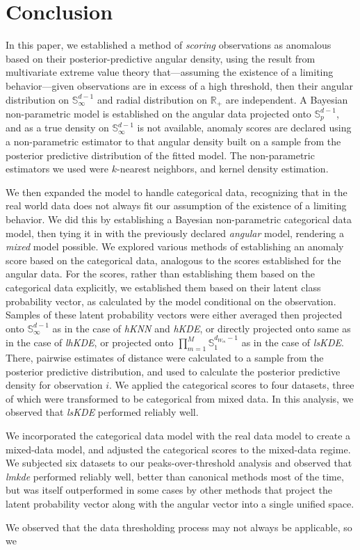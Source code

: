 \section{Conclusion\label{sec:conclusion}}
In this paper, we established a method of \emph{scoring} observations as anomalous based
    on their posterior-predictive angular density, using the result from multivariate 
    extreme value theory that---assuming the existence of a limiting behavior---given 
    observations are in excess of 
    a high threshold, then their angular distribution on $\mathbb{S}_{\infty}^{d-1}$ and 
    radial distribution on $\mathbb{R}_+$ are independent. A Bayesian non-parametric model 
    is established on the angular data projected onto $\mathbb{S}_p^{d-1}$, and as a 
    true density on $\mathbb{S}_{\infty}^{d-1}$ is not available, 
    anomaly scores are declared using a non-parametric estimator to that angular density 
    built on a sample from the posterior predictive distribution of the fitted model.  The
    non-parametric estimators we used were $k$-nearest neighbors, and kernel density estimation.

We then expanded the model to handle categorical data, recognizing that in the real world data
    does not always fit our assumption of the existence of a limiting behavior.  We did this
    by establishing a Bayesian non-parametric categorical data model, then tying it in with the
    previously declared \emph{angular} model, rendering a \emph{mixed} model possible.  
    We explored various methods of establishing an anomaly score based on the categorical data,
    analogous to the scores established for the angular data.
    For the scores, rather than establishing them based on the categorical data explicitly, we
    established them based on their latent class probability vector, as calculated by the model
    conditional on the observation. Samples of these latent probability vectors were either 
    averaged then projected onto $\mathbb{S}_{\infty}^{d-1}$ as in the case of \emph{hKNN} and 
    \emph{hKDE}, or directly projected onto same as in the case of \emph{lhKDE}, or projected onto
    $\prod_{m = 1}^M\mathbb{S}_1^{d_{W_m}-1}$ as in the case of \emph{lsKDE}.  There, pairwise 
    estimates of distance were calculated to a sample from the posterior predictive distribution, 
    and used to calculate the posterior predictive density for observation $i$. We applied the 
    categorical scores to four datasets, three of which were transformed to be categorical
    from mixed data.  In this analysis, we observed that \emph{lsKDE} performed reliably well.

We incorporated the categorical data model with the real data model to create a mixed-data model, 
    and adjusted the categorical scores to the mixed-data regime.  We subjected six datasets
    to our peaks-over-threshold analysis and observed that \emph{lmkde} performed reliably well,
    better than canonical methods most of the time, but was itself outperformed in some cases
    by other methods that project the latent probability vector along with the angular vector 
    into a single unified space.

We observed that the data thresholding process may not always be applicable, so we 
    
